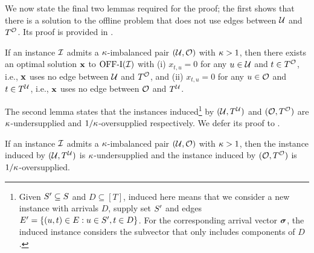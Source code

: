 We now state the final two lemmas required for the proof; the first shows that there is a solution to the offline problem that does not use edges between $\mathcal U$ and $T^\mathcal O$. Its proof is provided in .


\begin{lemma}
    \label{lemma: sol_does_not_use_edges}
    If an instance $\mathcal I$ admits a $\kappa$-imbalanced pair $(\mathcal U, \mathcal O)$ with $\kappa > 1$, then there exists an optimal solution $\mathbf{x}$ to $\mathrm{\mathrm{OFF}}\textrm{-}\mathrm{I}(\mathcal I)$ with (i) $x_{t, u} = 0$ for any $u \in \mathcal U$ and $t \in T^\mathcal O$, i.e., $\mathbf{x}$ uses no edge between $\mathcal U$ and $T^\mathcal O$, and (ii) $x_{t, u} = 0$ for any $u \in \mathcal O$ and $t \in T^\mathcal U$, i.e., $\mathbf{x}$ uses no edge between $\mathcal O$ and $T^\mathcal U$.
\end{lemma}
The second lemma states that the instances induced\footnote{Given $S' \subseteq S$ and $D \subseteq [T]$, induced here means that we consider a new instance with arrivals $D$, supply set $S'$ and edges $E' = \{(u,t) \in E: u \in S', t \in D\}$. For the corresponding arrival vector $\bm{\sigma}$, the induced instance considers the subvector that only includes components of $D$.} by $(\mathcal U, T^\mathcal U)$ and $(\mathcal O, T^\mathcal O)$ are $\kappa$-undersupplied and $1/\kappa$-oversupplied respectively. We defer its proof to .

\begin{lemma}
    \label{lemma: U and O are under/oversupplied}
    {If an instance $\mathcal I$ admits a $\kappa$-imbalanced pair $(\mathcal U, \mathcal O)$ with $\kappa > 1$, then the instance induced by %
    $(\mathcal U, T^\mathcal U)$ is $\kappa$-undersupplied and the instance induced by %
    $(\mathcal O, T^{\mathcal O})$ is $1/\kappa$-oversupplied.}
    
\end{lemma}

